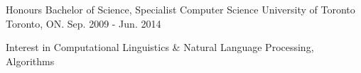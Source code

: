 

\begin{cventries}

  \cventry
    {Honours Bachelor of Science, Specialist Computer Science} %
    {University of Toronto} %
    {Toronto, ON.} %
    {Sep. 2009 - Jun. 2014} %
    {
      \begin{cvitems} %
        \item {Interest in Computational Linguistics \& Natural Language Processing, Algorithms}
      \end{cvitems}
    }

\end{cventries}
